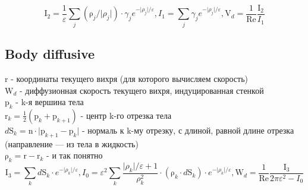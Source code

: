 \documentclass[11pt]{article}
\newcommand{\br}[1]{\boldsymbol{\mathrm{#1}}}
\begin{document}
\begin{equation*}
\br I_2 = \dfrac{1}{\varepsilon}
\sum\limits_j (\br\rho_j / \lvert\rho_j\rvert)\cdot\gamma_j e^{-\lvert\rho_j\rvert/\varepsilon},
I_1 = {\sum\limits_j \gamma_j e^{-\lvert\rho_j\rvert/\varepsilon}},
\br V_d = \dfrac{1}{\text{Re}} \dfrac{\br I_2}{I_1}
\end{equation*}

\begin{center}\setlength\fboxsep{0pt}
\setlength\fboxrule{0.5pt}
\end{center}

\subsection{Body diffusive}

$\br r$ - координаты текущего вихря (для которого вычисляем скорость) \\
$\br W_d$ - диффузионная скорость текущего вихря, индуцированная стенкой \\
$\br p_k$ - k-я вершина тела \\
$\br r_k = \frac{1}{2}(\br p_k + \br p_{k+1})$ - центр k-го отрезка тела \\
$d \br S_k = \br n \cdot\lvert\br p_{k+1} - \br p_k \rvert$ - нормаль к k-му отрезку, с длиной, равной длине отрезка (направление --- из тела в жидкость) \\
$\br{\rho}_k = \br r - \br r_k$ - и так понятно \\

\begin{equation*}
\br I_3 = {\sum\limits_k d\br S_k\cdot e^{-\lvert\rho_k\rvert/\varepsilon}},
I_0 = {\varepsilon^2\sum\limits_k \dfrac{\lvert\rho_k\rvert /\varepsilon +1}{\rho_k^2}
\cdot(\br\rho_k \cdot d\br S_k)\cdot e^{-\lvert\rho_k\rvert/\varepsilon}},
\br W_d = \dfrac{1}{\text{Re}} \dfrac{\br I_3}{2\pi\varepsilon^2 - I_0}
\end{equation*}
\end{document}
